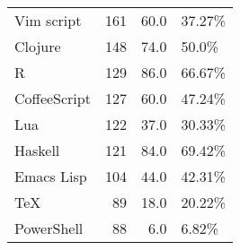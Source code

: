 \begin{table}
\begin{tabular}{lrrl}
Vim script       &          161 &      60.0 &        37.27\% \\
Clojure          &          148 &      74.0 &         50.0\% \\
R                &          129 &      86.0 &        66.67\% \\
CoffeeScript     &          127 &      60.0 &        47.24\% \\
Lua              &          122 &      37.0 &        30.33\% \\
Haskell          &          121 &      84.0 &        69.42\% \\
Emacs Lisp       &          104 &      44.0 &        42.31\% \\
TeX              &           89 &      18.0 &        20.22\% \\
PowerShell       &           88 &       6.0 &         6.82\% \\

\end{tabular}
\end{table}
